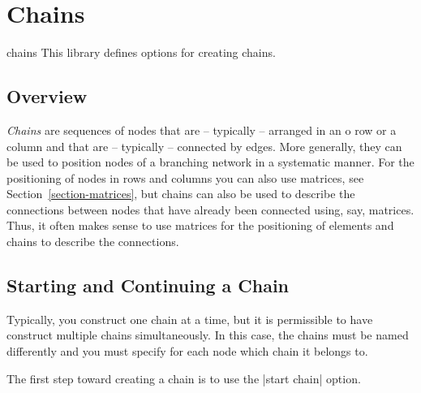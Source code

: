 %
%
%


\section{Chains}

\label{section-chains}

\begin{tikzlibrary}{chains}
  This library defines options for creating chains.
\end{tikzlibrary}


\subsection{Overview}

\emph{Chains} are sequences of nodes that are -- typically -- arranged
in an o row or a column and that are -- typically -- connected by
edges. More generally, they can be used to position nodes of a
branching network in a systematic manner. For the positioning of nodes
in rows and columns you can also use matrices, see 
Section~\ref{section-matrices}, but chains can also be used 
to describe the connections between nodes that have already been
connected using, say, matrices. Thus, it often makes sense to use
matrices for the positioning of elements and chains to describe the
connections. 



\subsection{Starting and Continuing a Chain}

Typically, you construct one chain at a time, but it is
permissible to have construct multiple chains simultaneously. In this
case, the chains must be named differently and you must specify for
each node which chain it belongs to.

The first step toward creating a chain is to use the |start chain|
option.


